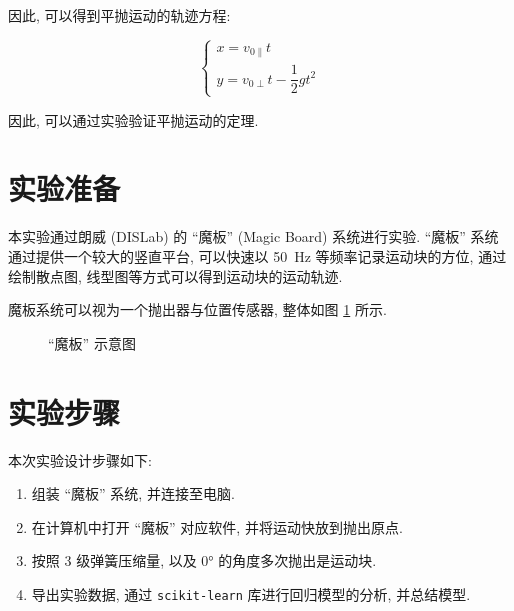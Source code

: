 \documentclass{article}
\begin{document}
因此, 可以得到平抛运动的轨迹方程:

\begin{equation}
    \begin{cases}
        x = v_{0\parallel}t \\
        y = v_{0\perp}t - \dfrac{1}{2}gt^2
    \end{cases}
\end{equation}

因此, 可以通过实验验证平抛运动的定理.

\section{实验准备}

本实验通过朗威 (DISLab) 的 ``魔板'' (Magic Board) 系统进行实验. ``魔板'' 系统通过提供一个较大的竖直平台, 可以快速以 \qty{50}{\hertz} 等频率记录运动块的方位, 通过绘制散点图, 线型图等方式可以得到运动块的运动轨迹.

魔板系统可以视为一个抛出器与位置传感器, 整体如图 \ref{fig:magic-board} 所示.

\begin{figure}[H]
    \centering
    \caption{``魔板'' 示意图}
    \label{fig:magic-board}
\end{figure}

\section{实验步骤}

本次实验设计步骤如下:

\begin{enumerate}
    \item 组装 ``魔板'' 系统, 并连接至电脑.
    \item 在计算机中打开 ``魔板'' 对应软件, 并将运动快放到抛出原点.
    \item 按照 $3$ 级弹簧压缩量, 以及 \ang{0} 的角度多次抛出是运动块.
    \item 导出实验数据, 通过 \texttt{scikit-learn} 库进行回归模型的分析, 并总结模型.
\end{enumerate}
\end{document}
